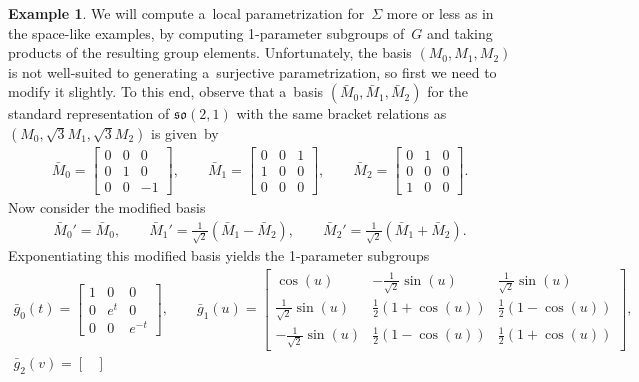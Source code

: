 \documentclass[10pt,a4paper]{amsart}
\numberwithin{equation}{section}
\theoremstyle{definition}
\newtheorem{exmpl}[teo]{Example}
\begin{document}
\begin{exmpl}
We will compute a~local parametrization for~$\Sigma$ more or less as in the space-like examples, by computing 1-parameter
subgroups of~$G$ and taking products of the resulting group elements.
Unfortunately, the basis $(M_0, M_1, M_2)$ is not well-suited to generating a~surjective parametrization, so f\/irst we
need to modify it slightly.
To this end, observe that a~basis $(\bar{M}_0, \bar{M}_1, \bar{M}_2)$ for the standard representation of
$\mathfrak{so}(2,1)$ with the same bracket relations as $(M_0, \sqrt{3}M_1, \sqrt{3}M_2)$ is given~by
\begin{gather*}
\bar{M}_0 =
\begin{bmatrix}
0 & 0 & 0
\\
0 & 1 & 0
\\
0 & 0 & -1
\end{bmatrix},
\qquad
\bar{M}_1 =
\begin{bmatrix}
0 & 0 & 1
\\
1 & 0 & 0
\\
0 & 0 & 0
\end{bmatrix},
\qquad
\bar{M}_2 =
\begin{bmatrix}
0 & 1 & 0
\\
0 & 0 & 0
\\
1 & 0 & 0
\end{bmatrix}.
\end{gather*}
Now consider the modif\/ied basis
\begin{gather*}
\bar{M}_0' = \bar{M}_0,
\qquad
\bar{M}_1' = \frac{1}{\sqrt{2}}(\bar{M}_1 - \bar{M}_2),
\qquad
\bar{M}_2' = \frac{1}{\sqrt{2}}(\bar{M}_1 + \bar{M}_2).
\end{gather*}
Exponentiating this modif\/ied basis yields the 1-parameter subgroups
\begin{gather*}
\bar{g}_0(t) =
\begin{bmatrix}
1 & 0 & 0
\\
0 & e^t & 0
\\
0 & 0 & e^{-t}
\end{bmatrix},
\qquad
\bar{g}_1(u) =
\begin{bmatrix}
\cos(u) & -\frac{1}{\sqrt{2}}\sin(u) & \frac{1}{\sqrt{2}}\sin(u)
\\
\frac{1}{\sqrt{2}}\sin(u) & \frac{1}{2}(1 + \cos(u)) & \frac{1}{2}(1 - \cos(u))
\\
-\frac{1}{\sqrt{2}}\sin(u) & \frac{1}{2}(1 - \cos(u)) & \frac{1}{2}(1 + \cos(u))
\end{bmatrix},
\\
\bar{g}_2(v) =
\begin{bmatrix}

\end{bmatrix}
\end{gather*}
\end{exmpl}
\end{document}

